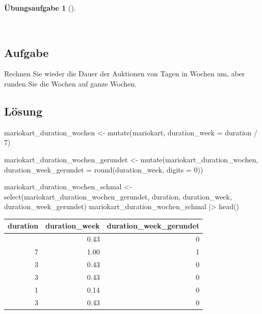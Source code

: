 \documentclass[
  a4paper,
  DIV=11]{scrreprt}
\newenvironment{Shaded}{\begin{snugshade}}{\end{snugshade}}
\newcommand{\AttributeTok}[1]{\textcolor[rgb]{0.40,0.45,0.13}{#1}}
\newcommand{\DecValTok}[1]{\textcolor[rgb]{0.68,0.00,0.00}{#1}}
\newcommand{\FunctionTok}[1]{\textcolor[rgb]{0.28,0.35,0.67}{#1}}
\newcommand{\NormalTok}[1]{\textcolor[rgb]{0.00,0.23,0.31}{#1}}
\newcommand{\OtherTok}[1]{\textcolor[rgb]{0.00,0.23,0.31}{#1}}
\newcommand{\SpecialCharTok}[1]{\textcolor[rgb]{0.37,0.37,0.37}{#1}}
\theoremstyle{definition}
\newtheorem{exercise}{Übungsaufgabe}[chapter]
\theoremstyle{definition}
\theoremstyle{definition}
\theoremstyle{remark}
\begin{document}
\begin{exercise}[]\protect\hypertarget{exr-mutate2}{}\label{exr-mutate2}

~

\subsection{Aufgabe}

Rechnen Sie wieder die Dauer der Auktionen von Tagen in Wochen um, aber
runden Sie die Wochen auf ganze Wochen.

\subsection{Lösung}

\begin{Shaded}
\begin{Highlighting}[]
\NormalTok{mariokart\_duration\_wochen }\OtherTok{\textless{}{-}} 
  \FunctionTok{mutate}\NormalTok{(mariokart, }\AttributeTok{duration\_week =}\NormalTok{ duration }\SpecialCharTok{/} \DecValTok{7}\NormalTok{)}

\NormalTok{mariokart\_duration\_wochen\_gerundet }\OtherTok{\textless{}{-}}
  \FunctionTok{mutate}\NormalTok{(mariokart\_duration\_wochen, }\AttributeTok{duration\_week\_gerundet =}
           \FunctionTok{round}\NormalTok{(duration\_week, }\AttributeTok{digits =} \DecValTok{0}\NormalTok{))}

\NormalTok{mariokart\_duration\_wochen\_schmal }\OtherTok{\textless{}{-}}
  \FunctionTok{select}\NormalTok{(mariokart\_duration\_wochen\_gerundet, duration, }
\NormalTok{         duration\_week, duration\_week\_gerundet)}
\NormalTok{mariokart\_duration\_wochen\_schmal }\SpecialCharTok{|\textgreater{}} \FunctionTok{head}\NormalTok{()}
\end{Highlighting}
\end{Shaded}

\begin{longtable}[]{@{}rrr@{}}
\toprule\noalign{}
duration & duration\_week & duration\_week\_gerundet \\
\midrule\noalign{}
\endhead
\bottomrule\noalign{}
\endlastfoot
3 & 0.43 & 0 \\
7 & 1.00 & 1 \\
3 & 0.43 & 0 \\
3 & 0.43 & 0 \\
1 & 0.14 & 0 \\
3 & 0.43 & 0 \\
\end{longtable}

\end{exercise}
\end{document}
